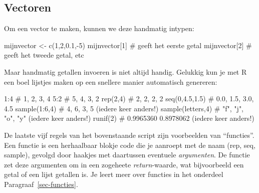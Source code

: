 \documentclass[
  a4paper,
]{scrbook}
\newenvironment{Shaded}{\begin{snugshade}}{\end{snugshade}}
\newcommand{\CommentTok}[1]{\textcolor[rgb]{0.37,0.37,0.37}{#1}}
\newcommand{\DecValTok}[1]{\textcolor[rgb]{0.68,0.00,0.00}{#1}}
\newcommand{\FloatTok}[1]{\textcolor[rgb]{0.68,0.00,0.00}{#1}}
\newcommand{\FunctionTok}[1]{\textcolor[rgb]{0.28,0.35,0.67}{#1}}
\newcommand{\NormalTok}[1]{\textcolor[rgb]{0.00,0.23,0.31}{#1}}
\newcommand{\OtherTok}[1]{\textcolor[rgb]{0.00,0.23,0.31}{#1}}
\newcommand{\SpecialCharTok}[1]{\textcolor[rgb]{0.37,0.37,0.37}{#1}}
\theoremstyle{definition}
\theoremstyle{remark}
\begin{document}
\subsection{Vectoren}\label{sec-vectoren}

Om een vector te maken, kunnen we deze handmatig intypen:

\begin{Shaded}
\begin{Highlighting}[]
\NormalTok{mijnvector }\OtherTok{\textless{}{-}} \FunctionTok{c}\NormalTok{(}\DecValTok{1}\NormalTok{,}\DecValTok{2}\NormalTok{,}\FloatTok{0.1}\NormalTok{,}\SpecialCharTok{{-}}\DecValTok{5}\NormalTok{)}
\NormalTok{mijnvector[}\DecValTok{1}\NormalTok{] }\CommentTok{\# geeft het eerste getal}
\NormalTok{mijnvector[}\DecValTok{2}\NormalTok{] }\CommentTok{\# geeft het tweede getal, etc}
\end{Highlighting}
\end{Shaded}

Maar handmatig getallen invoeren is niet altijd handig. Gelukkig kun je
met R een boel lijstjes maken op een snellere manier automatisch
genereren:

\begin{Shaded}
\begin{Highlighting}[]
\DecValTok{1}\SpecialCharTok{:}\DecValTok{4}                \CommentTok{\# 1, 2, 3, 4}
\DecValTok{5}\SpecialCharTok{:}\DecValTok{2}                \CommentTok{\# 5, 4, 3, 2}
\FunctionTok{rep}\NormalTok{(}\DecValTok{2}\NormalTok{,}\DecValTok{4}\NormalTok{)           }\CommentTok{\# 2, 2, 2, 2}
\FunctionTok{seq}\NormalTok{(}\DecValTok{0}\NormalTok{,}\FloatTok{4.5}\NormalTok{,}\FloatTok{1.5}\NormalTok{)     }\CommentTok{\# 0.0, 1.5, 3.0, 4.5}
\FunctionTok{sample}\NormalTok{(}\DecValTok{1}\SpecialCharTok{:}\DecValTok{6}\NormalTok{,}\DecValTok{4}\NormalTok{)      }\CommentTok{\# 4, 6, 3, 5 (iedere keer anders!)}
\FunctionTok{sample}\NormalTok{(letters,}\DecValTok{4}\NormalTok{)  }\CommentTok{\# "f", "j", "o", "y" (iedere keer anders!)}
\FunctionTok{runif}\NormalTok{(}\DecValTok{2}\NormalTok{)           }\CommentTok{\# 0.9965360 0.8978062 (iedere keer anders!)}
\end{Highlighting}
\end{Shaded}

De laatste vijf regels van het bovenstaande script zijn voorbeelden van
``functies''. Een functie is een herhaalbaar blokje code die je aanroept
met de naam (rep, seq, sample), gevolgd door haakjes met daartussen
eventuele \emph{argumenten}. De functie zet deze argumenten om in een
zogeheete \emph{return}-waarde, wat bijvoorbeeld een getal of een lijst
getallen is. Je leert meer over functies in het onderdeel
Paragraaf~\ref{sec-functies}.
\end{document}
